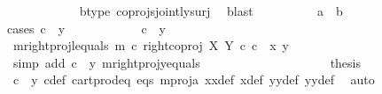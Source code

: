 \begin{isabellebody}
\ \ \ \ \ \ \ \ \ \ \isamarkupfalse%
\ b{\isacharunderscore}{\kern0pt}type\ coprojs{\isacharunderscore}{\kern0pt}jointly{\isacharunderscore}{\kern0pt}surj\ \isamarkupfalse%
\ blast\isanewline
\ \ \ \ \ \ \ \ \isamarkupfalse%
\ {\isachardoublequoteopen}a\ {\isacharequal}{\kern0pt}\ b{\isachardoublequoteclose}\isanewline
\ \ \ \ \ \ \ \ \isamarkupfalse%
{\isacharparenleft}{\kern0pt}cases\ {\isachardoublequoteopen}c\ {\isacharequal}{\kern0pt}\ y{}{\isachardoublequoteclose}{\isacharparenright}{\kern0pt}\isanewline
\ \ \ \ \ \ \ \ \ \ \isamarkupfalse%
\ {\isachardoublequoteopen}c\ {\isacharequal}{\kern0pt}\ y{}{\isachardoublequoteclose}\ \ \ \ \ \ \ \isanewline
\ \ \ \ \ \ \ \ \ \ \isamarkupfalse%
\ m{\isacharunderscore}{\kern0pt}rightproj{\isacharunderscore}{\kern0pt}l{\isacharunderscore}{\kern0pt}equals{\isacharcolon}{\kern0pt}\ {\isachardoublequoteopen}m\ {\isasymcirc}\isactrlsub c\ right{\isacharunderscore}{\kern0pt}coproj\ X\ Y\ {\isasymcirc}\isactrlsub c\ c\ {\isacharequal}{\kern0pt}\ {\isasymlangle}x{}{\isacharcomma}{\kern0pt}\ y{}{\isasymrangle}{\isachardoublequoteclose}\isanewline
\ \ \ \ \ \ \ \ \ \ \ \ \isamarkupfalse%
\ {\isacharparenleft}{\kern0pt}simp\ add{\isacharcolon}{\kern0pt}\ {\isacartoucheopen}c\ {\isacharequal}{\kern0pt}\ y{}{\isacartoucheclose}\ m{\isacharunderscore}{\kern0pt}rightproj{\isacharunderscore}{\kern0pt}y{}{\isacharunderscore}{\kern0pt}equals{\isacharparenright}{\kern0pt}\ \ \ \ \ \ \ \isanewline
\ \ \ \ \ \ \ \ \ \ \isamarkupfalse%
\ \isamarkupfalse%
\ {\isacharquery}{\kern0pt}thesis\isanewline
\ \ \ \ \ \ \ \ \ \ \ \ \isamarkupfalse%
\ {\isacartoucheopen}c\ {\isacharequal}{\kern0pt}\ y{}{\isacartoucheclose}\ c{\isacharunderscore}{\kern0pt}def\ cart{\isacharunderscore}{\kern0pt}prod{\isacharunderscore}{\kern0pt}eq{}\ eqs\ m{\isacharunderscore}{\kern0pt}proj{\isacharunderscore}{\kern0pt}a\ x{}x{}{\isacharunderscore}{\kern0pt}def{\isacharparenleft}{\kern0pt}{}{\isacharparenright}{\kern0pt}\ x{\isacharunderscore}{\kern0pt}def\ y{}y{}{\isacharunderscore}{\kern0pt}def{\isacharparenleft}{\kern0pt}{}{\isacharparenright}{\kern0pt}\ y{}y{}{\isacharunderscore}{\kern0pt}def{\isacharparenleft}{\kern0pt}{}{\isacharparenright}{\kern0pt}\ \isamarkupfalse%
\ auto\isanewline

\end{isabellebody}
